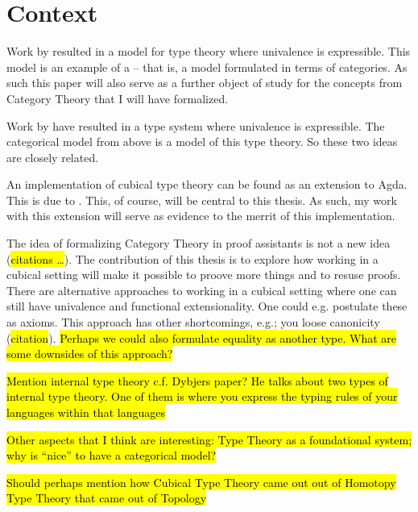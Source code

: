 \documentclass{article}
\newcommand{\sectiondescription}[1]{\iffalse #1\fi}
\newcommand{\mycomment}[1]{\hl{#1}}
\begin{document}
\section{Context}
%
\sectiondescription{%
Use one or two relevant and high quality references for providing evidence from
the literature that the proposed study indeed includes scientific and
engineering challenges, or is related to existing ones. Convince the reader that
the problem addressed in this thesis has not been solved prior to this project.
}
%
Work by \citeauthor{bezem-2014} resulted in a model for type theory where
univalence is expressible. This model is an example of a  -- that is, a model formulated in terms of categories. As such this
paper will also serve as a further object of study for the concepts from
Category Theory that I will have formalized.

Work by \citeauthor{cohen-2016} have resulted in a type system where univalence
is expressible. The categorical model from above is a model of this type theory.
So these two ideas are closely related.

An implementation of cubical type theory can be found as an extension to Agda.
This is due to \citeauthor{cubical-agda}. This, of course, will be central to
this thesis. As such, my work with this extension will serve as evidence to the
merrit of this implementation.

The idea of formalizing Category Theory in proof assistants is not a new idea
(\mycomment{citations \ldots}). The contribution of this thesis is to explore
how working in a cubical setting will make it possible to proove more things and
to resuse proofs. There are alternative approaches to working in a cubical
setting where one can still have univalence and functional extensionality. One
could e.g. postulate these as axioms. This approach has other shortcomings,
e.g.; you loose canonicity (\mycomment{citation}). \mycomment{Perhaps we could
  also formulate equality as another type. What are some downsides of this
  approach?}

\mycomment{Mention internal type theory c.f. Dybjers paper? He talks about two
types of internal type theory. One of them is where you express the typing
rules of your languages within that languages}

\mycomment{Other aspects that I think are interesting: Type Theory as a foundational
system; why is ``nice'' to have a categorical model?}

\mycomment{Should perhaps mention how Cubical Type Theory came out out of Homotopy
Type Theory that came out of Topology}
%
\end{document}
